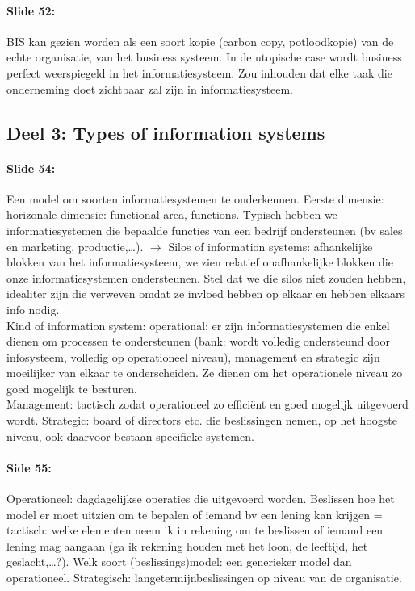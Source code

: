 \documentclass[10pt,a4paper]{report}
\begin{document}
\paragraph{Slide 52:}BIS kan gezien worden als een soort kopie (carbon copy, potloodkopie) van de echte organisatie, van het business systeem. In de utopische case wordt business perfect weerspiegeld in het informatiesysteem. Zou inhouden dat elke taak die onderneming doet zichtbaar zal zijn in informatiesysteem.

\subsection{Deel 3: Types of information systems}
\paragraph{Slide 54:}Een model om soorten informatiesystemen te onderkennen. Eerste dimensie: horizonale dimensie: functional area, functions. Typisch hebben we informatiesystemen die bepaalde functies van een bedrijf ondersteunen (bv sales en marketing, productie,…). $\rightarrow$ Silos of information systems: afhankelijke blokken van het informatiesysteem, we zien relatief onafhankelijke blokken die onze informatiesystemen ondersteunen. Stel dat we die silos niet zouden hebben, idealiter zijn die verweven omdat ze invloed hebben op elkaar en hebben elkaars info nodig.\\
Kind of information system: operational: er zijn informatiesystemen die enkel dienen om processen te ondersteunen (bank: wordt volledig ondersteund door infosysteem, volledig op operationeel niveau), management en strategic zijn moeilijker van elkaar te onderscheiden. Ze dienen om het operationele niveau zo goed mogelijk te besturen.\\ 
Management: tactisch zodat operationeel zo efficiënt en goed mogelijk uitgevoerd wordt. Strategic: board of directors etc. die beslissingen nemen, op het hoogste niveau, ook daarvoor bestaan specifieke systemen.

\paragraph{Side 55:}Operationeel: dagdagelijkse operaties die uitgevoerd worden. Beslissen hoe het model er moet uitzien om te bepalen of iemand bv een lening kan krijgen = tactisch: welke elementen neem ik in rekening om te beslissen of iemand een lening mag aangaan (ga ik rekening houden met het loon, de leeftijd, het geslacht,\ldots?). Welk soort (beslissings)model: een generieker model dan operationeel. Strategisch: langetermijnbeslissingen op niveau van de organisatie.
\end{document}

